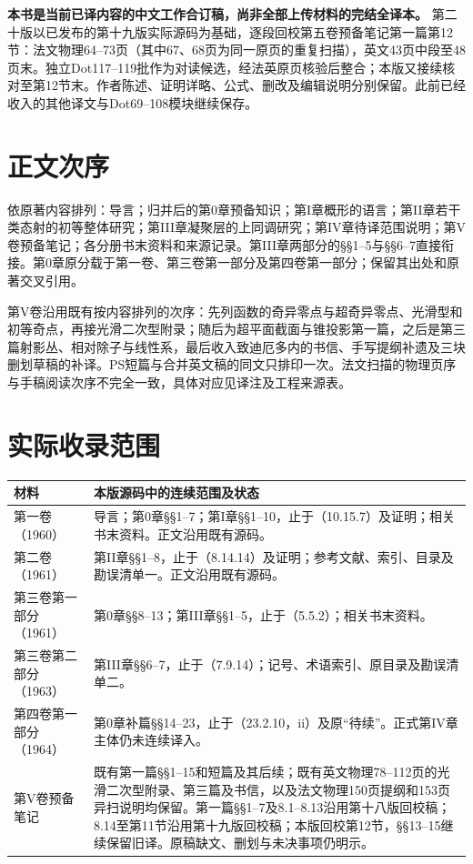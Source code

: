 \maketitle
{}
\noindent\textbf{本书是当前已译内容的中文工作合订稿，尚非全部上传材料的完结全译本。}
第二十版以已发布的第十九版实际源码为基础，逐段回校第五卷预备笔记第一篇第12节：法文物理64--73页（其中67、68页为同一原页的重复扫描），英文43页中段至48页末。独立Dot117--119批作为对读候选，经法英原页核验后整合；本版又接续核对至第12节末。作者陈述、证明详略、公式、删改及编辑说明分别保留。此前已经收入的其他译文与Dot69--108模块继续保存。

\section*{正文次序}
依原著内容排列：导言；归并后的第0章预备知识；第I章概形的语言；第II章若干类态射的初等整体研究；第III章凝聚层的上同调研究；第IV章待译范围说明；第V卷预备笔记；各分册书末资料和来源记录。第III章两部分的§§1--5与§§6--7直接衔接。第0章原分载于第一卷、第三卷第一部分及第四卷第一部分；保留其出处和原著交叉引用。

第V卷沿用既有按内容排列的次序：先列函数的奇异零点与超奇异零点、光滑型和初等奇点，再接光滑二次型附录；随后为超平面截面与锥投影第一篇，之后是第三篇射影丛、相对除子与线性系，最后收入致迪厄多内的书信、手写提纲补遗及三块删划草稿的补译。PS短篇与合并英文稿的同文只排印一次。法文扫描的物理页序与手稿阅读次序不完全一致，具体对应见译注及工程来源表。

\clearpage
\section*{实际收录范围}
\begin{longtable}{@{}p{.25\linewidth}p{.67\linewidth}@{}}
\toprule 材料&本版源码中的连续范围及状态\\\midrule\endhead
第一卷（1960）&导言；第0章§§1--7；第I章§§1--10，止于（10.15.7）及证明；相关书末资料。正文沿用既有源码。\\
第二卷（1961）&第II章§§1--8，止于（8.14.14）及证明；参考文献、索引、目录及勘误清单一。正文沿用既有源码。\\
第三卷第一部分（1961）&第0章§§8--13；第III章§§1--5，止于（5.5.2）；相关书末资料。\\
第三卷第二部分（1963）&第III章§§6--7，止于（7.9.14）；记号、术语索引、原目录及勘误清单二。\\
第四卷第一部分（1964）&第0章补篇§§14--23，止于（23.2.10，ii）及原“待续”。正式第IV章主体仍未连续译入。\\
第V卷预备笔记&既有第一篇§§1--15和短篇及其后续；既有英文物理78--112页的光滑二次型附录、第三篇及书信，以及法文物理150页提纲和153页异扫说明均保留。第一篇§§1--7及8.1--8.13沿用第十八版回校稿；8.14至第11节沿用第十九版回校稿；本版回校第12节，§§13--15继续保留旧译。原稿缺文、删划与未决事项仍明示。\\
\bottomrule
\end{longtable}


